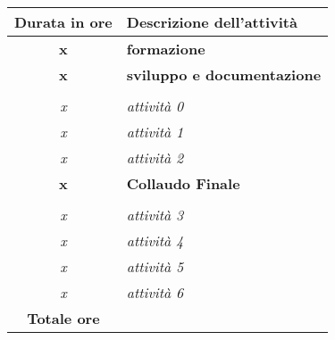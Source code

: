 

\begin{tabularx}{\textwidth}{|c|X|}
	\hline
	\textbf{Durata in ore} & \textbf{Descrizione dell'attività} \\\hline
	
	\textbf{x} & \textbf{formazione} \\	 
    \hline
    
    \textbf{x} & \textbf{sviluppo e documentazione} \\ \hdashline 
    \multirow{3}{0cm}\\ 
    \textit{x} & 
    \textit{attività 0} \\
    \textit{x} & 
    \textit{attività 1} \\
    \textit{x} & 
    \textit{attività 2} \\
    \hline
    
    \textbf{x} & \textbf{Collaudo Finale}  \\ \hdashline 
    \multirow{4}{0cm}\\ 
    \textit{x} & 
    \textit{attività 3} \\
    \textit{x} & 
    \textit{attività 4} \\
    \textit{x} & 
    \textit{attività 5} \\
    \textit{x} & 
    \textit{attività 6} \\
    \hline
	
	\textbf{Totale ore} & \multicolumn{1}{|c|}{\textbf{\totaleOre}} \\\hline
	
	
\end{tabularx}